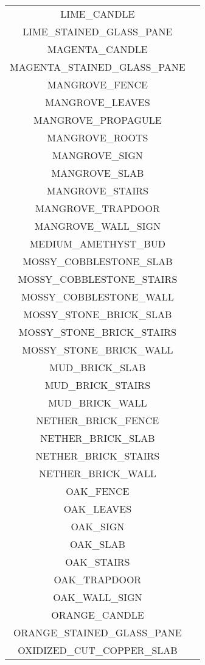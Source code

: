 \begin{longtable}{ |c|c| }
	LIME\_CANDLE & \xmark \\
	LIME\_STAINED\_GLASS\_PANE & \xmark \\
	MAGENTA\_CANDLE & \xmark \\
	MAGENTA\_STAINED\_GLASS\_PANE & \xmark \\
	MANGROVE\_FENCE & \xmark \\
	MANGROVE\_LEAVES & \xmark \\
	MANGROVE\_PROPAGULE & \xmark \\
	MANGROVE\_ROOTS & \xmark \\
	MANGROVE\_SIGN & \xmark \\
	MANGROVE\_SLAB & \xmark \\
	MANGROVE\_STAIRS & \xmark \\
	MANGROVE\_TRAPDOOR & \xmark \\
	MANGROVE\_WALL\_SIGN & \xmark \\
	MEDIUM\_AMETHYST\_BUD & \xmark \\
	MOSSY\_COBBLESTONE\_SLAB & \xmark \\
	MOSSY\_COBBLESTONE\_STAIRS & \xmark \\
	MOSSY\_COBBLESTONE\_WALL & \xmark \\
	MOSSY\_STONE\_BRICK\_SLAB & \xmark \\
	MOSSY\_STONE\_BRICK\_STAIRS & \xmark \\
	MOSSY\_STONE\_BRICK\_WALL & \xmark \\
	MUD\_BRICK\_SLAB & \xmark \\
	MUD\_BRICK\_STAIRS & \xmark \\
	MUD\_BRICK\_WALL & \xmark \\
	NETHER\_BRICK\_FENCE & \xmark \\
	NETHER\_BRICK\_SLAB & \xmark \\
	NETHER\_BRICK\_STAIRS & \xmark \\
	NETHER\_BRICK\_WALL & \xmark \\
	OAK\_FENCE & \xmark \\
	OAK\_LEAVES & \xmark \\
	OAK\_SIGN & \xmark \\
	OAK\_SLAB & \xmark \\
	OAK\_STAIRS & \xmark \\
	OAK\_TRAPDOOR & \xmark \\
	OAK\_WALL\_SIGN & \xmark \\
	ORANGE\_CANDLE & \xmark \\
	ORANGE\_STAINED\_GLASS\_PANE & \xmark \\
	OXIDIZED\_CUT\_COPPER\_SLAB & \xmark \\

\end{longtable}
